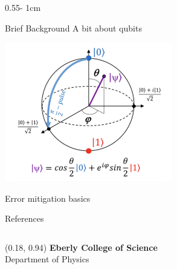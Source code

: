 \documentclass{../psuposter}
\begin{document}
\begin{frame}
\begin{columns}[t, totalwidth=\textwidth]
\begin{column}{0.55\textwidth - 1cm}
    \begin{block}{Brief Background}
        A bit about qubits \cite{jazaeriReviewQuantumComputing2019}

        \begin{center}
		   	\includegraphics[width=0.55\textwidth]{images/bloch}    		
    	\end{center}
        
		Error mitigation basics \cite{kandalaExtendingComputationalReach2019}

    \end{block}


    \begin{block}{References}
        
		
    \end{block}

\end{column}
\end{columns}


\begin{textblock}{0.5}(0.18, 0.94)
    \color{white}
    \sffamily
    \textbf{Eberly College of Science}
    \\
    Department of Physics
\end{textblock}


\end{frame}
\end{document}
